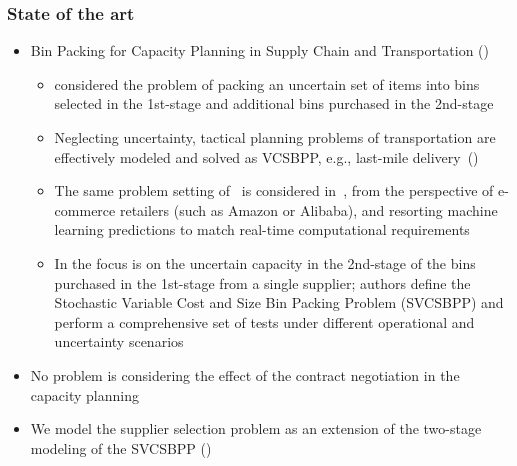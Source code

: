 \documentclass[,9pt,xcolor={dvipsnames}]{beamer} %
\begin{document}
\begin{frame}%
	\frametitle{State of the art}
	\begin{itemize}
		\item<1-> Bin Packing for Capacity Planning in Supply Chain and Transportation (\cite{chapterBernard2024}) 
		\begin{itemize}
        	\item<1-> \cite{crainic2016logistics} considered the problem of packing an uncertain set of items into bins selected in the 1st-stage and additional bins purchased in the 2nd-stage
	        \item<2-> Neglecting uncertainty, tactical planning problems of transportation are effectively modeled and solved as VCSBPP, e.g., last-mile delivery~(\cite{perboli2021new})
		    \item<3-> The same problem setting of~\cite{crainic2016logistics} is considered in~\cite{bruni2023machine}, from the perspective of e-commerce retailers (such as Amazon or Alibaba), and resorting machine learning predictions to match real-time computational requirements
	        \item<4-> In \cite{crainic2024} the focus is on the uncertain capacity in the 2nd-stage of the bins purchased in the 1st-stage from a single supplier; %
	        authors define the Stochastic Variable Cost and Size Bin Packing Problem (SVCSBPP) and perform a comprehensive set of tests under different operational and uncertainty scenarios
		\end{itemize}
    	\item<5-> No problem is considering the effect of the contract negotiation in the capacity planning
	    \item<6-> We model the supplier selection problem as an extension of the two-stage modeling of the SVCSBPP (\cite{crainic2024})
	\end{itemize}
\end{frame}
\end{document}
